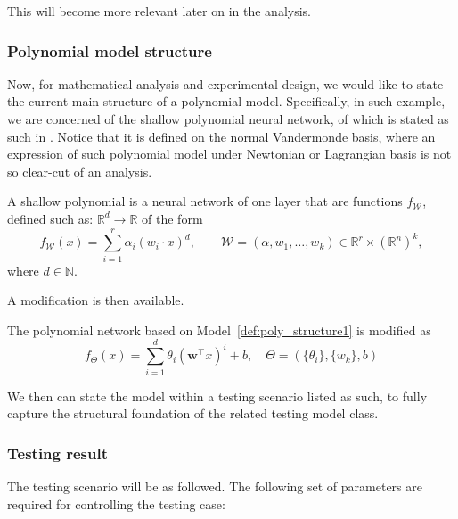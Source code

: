 \documentclass[10pt]{article} %
\begin{document}
This will become more relevant later on in the analysis. 

\subsubsection{Polynomial model structure} 

Now, for mathematical analysis and experimental design, we would like to state the current main structure of a polynomial model. Specifically, in such example, we are concerned of the shallow polynomial neural network, of which is stated as such in \cite{arjevani2025geometryoptimizationshallowpolynomial}. Notice that it is defined on the normal Vandermonde basis, where an expression of such polynomial model under Newtonian or Lagrangian basis is not so clear-cut of an analysis.  

\begin{definition}\label{def:poly_structure1}
    A shallow polynomial is a neural network of one layer that are functions $f_{\mathcal W}$, defined such as:
$\mathbb R^d \rightarrow \mathbb{R}$ of the form
\begin{equation}\label{eq:network_model} f_{\mathcal W}(x) = \sum_{i=1}^r
\alpha_{i} (w_i \cdot x)^d, \qquad \mathcal W = (\alpha,w_1,\ldots,w_k) \in
\mathbb{R}^r \times (\mathbb{R}^{n})^k,
\end{equation} 
where $d \in \mathbb{N}$.
\end{definition}
A modification is then available. 
\begin{definition}
    The polynomial network based on Model~\ref{def:poly_structure1} is modified as 
    \begin{equation}
        f_{\Theta}(x) = \sum_{i=1}^{d} \theta_i \left( \mathbf{w}^\top x \right)^i + b, \quad \Theta = (\{\theta_{i}\},\{w_{k}\},b)
    \end{equation}
\end{definition}
We then can state the model within a testing scenario listed as such, to fully capture the structural foundation of the related testing model class. 

\subsubsection{Testing result}
The testing scenario will be as followed. The following set of parameters are required for controlling the testing case: 
\end{document}
